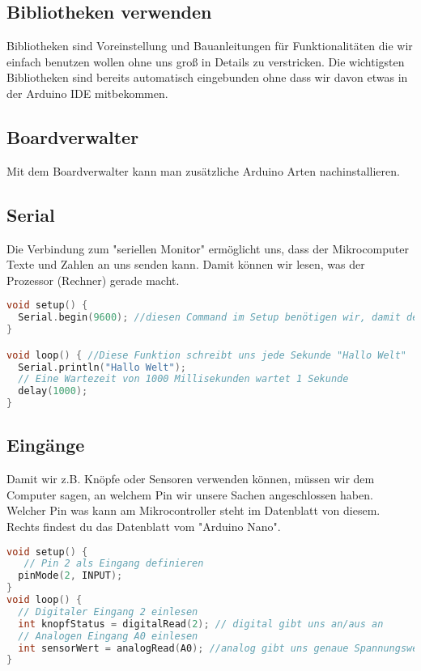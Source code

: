 \subsection{\large{Bibliotheken verwenden}}
Bibliotheken sind Voreinstellung und Bauanleitungen für Funktionalitäten die wir einfach benutzen wollen ohne uns groß in Details zu verstricken. Die wichtigsten Bibliotheken sind bereits automatisch eingebunden ohne dass wir davon etwas in der Arduino IDE mitbekommen.\\
\subsection{\large{Boardverwalter}}
Mit dem Boardverwalter kann man zusätzliche Arduino Arten nachinstallieren.\\
 

\subsection{Serial}
Die Verbindung zum "seriellen Monitor" ermöglicht uns, dass der Mikrocomputer Texte und Zahlen an uns senden kann. Damit können wir lesen, was der Prozessor (Rechner) gerade macht. 
\begin{lstlisting}[language=c, caption=Ausgabe von Text an den Programmierer]
void setup() {
  Serial.begin(9600); //diesen Command im Setup benötigen wir, damit der Computer weiß, wie er mit uns reden soll
}

void loop() { //Diese Funktion schreibt uns jede Sekunde "Hallo Welt"
  Serial.println("Hallo Welt");
  // Eine Wartezeit von 1000 Millisekunden wartet 1 Sekunde    
  delay(1000);        
}
\end{lstlisting}
\newpage
\subsection{\large{Eingänge}}
Damit wir z.B. Knöpfe oder Sensoren verwenden können, müssen wir dem Computer sagen, an welchem Pin wir unsere Sachen angeschlossen haben. Welcher Pin was kann am Mikrocontroller steht im Datenblatt von diesem. Rechts findest du das Datenblatt vom "Arduino Nano".
\begin{lstlisting}[language=c, caption=Eingänge am Arduino lesen]
void setup() {
   // Pin 2 als Eingang definieren
  pinMode(2, INPUT); 
}
void loop() {
  // Digitaler Eingang 2 einlesen
  int knopfStatus = digitalRead(2); // digital gibt uns an/aus an
  // Analogen Eingang A0 einlesen
  int sensorWert = analogRead(A0); //analog gibt uns genaue Spannungswerte am jeweiligen Pin an
}
\end{lstlisting}
\newpage

